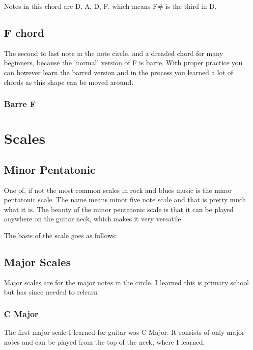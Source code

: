 \documentclass[11pt]{book}
\begin{document}
    Notes in this chord are D, A, D, F, which means F\# is the third in D.


    \section{F chord}
    The second to last note in the note circle, and a dreaded chord for many beginners, because the 'normal' version of
    F is barre.
    With proper practice you can however learn the barred version and in the process you learned a lot of chords as this shape can be moved around.

    \subsection{Barre F}

    \chordscheme[
    name = F,
    finger = {3/5:4,3/4:4,2/3:2},
    barre = {1/1-6:1}
    ]


    \chapter{Scales}


    \section{Minor Pentatonic}
    One of, if not the most common scales in rock and blues music is the minor pentatonic scale.
    The name means minor five note scale and that is pretty much what it is.
    The beauty of the minor pentatonic scale is that it can be played anywhere on the guitar neck, which makes it very versatile.

    The basis of the scale goes as follows:

    \bigskip

    \scales[
    name = Minor Pentatonic,
    finger = {
    2/1:1, 5/1:4,
    2/2:1, 5/2:4,
    2/3:1, 4/3:3,
    2/4:1, 4/4:3,
    2/5:1, 4/5:3,
    2/6:1, 5/6:4
    },
    root = {2/6, 4/4, 2/1}
    ]


    \section{Major Scales}
    Major scales are for the major notes in the circle.
    I learned this is primary school but has since needed to relearn

    \subsection{C Major}
    The first major scale I learned for guitar was C Major.
    It consists of only major notes and can be played from the top of the neck, where I learned.
\end{document}

